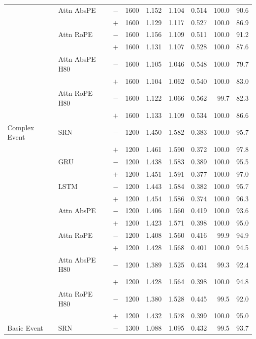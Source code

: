 \begin{table}[t]
\begin{tabular}{@{}lllrrrrrr@{}}
 & Attn AbsPE & $-$ & 1600 & 1.152 & 1.104 & 0.514 & 100.0 & 90.6 \\
 &  & $+$ & 1600 & 1.129 & 1.117 & 0.527 & 100.0 & 86.9 \\
\addlinespace[1pt]
 & Attn RoPE & $-$ & 1600 & 1.156 & 1.109 & 0.511 & 100.0 & 91.2 \\
 &  & $+$ & 1600 & 1.131 & 1.107 & 0.528 & 100.0 & 87.6 \\
\addlinespace[1pt]
 & Attn AbsPE H80 & $-$ & 1600 & 1.105 & 1.046 & 0.548 & 100.0 & 79.7 \\
 &  & $+$ & 1600 & 1.104 & 1.062 & 0.540 & 100.0 & 83.0 \\
\addlinespace[1pt]
 & Attn RoPE H80 & $-$ & 1600 & 1.122 & 1.066 & 0.562 & 99.7 & 82.3 \\
 &  & $+$ & 1600 & 1.133 & 1.109 & 0.534 & 100.0 & 86.6 \\
\addlinespace
Complex Event & SRN & $-$ & 1200 & 1.450 & 1.582 & 0.383 & 100.0 & 95.7 \\
 &  & $+$ & 1200 & 1.461 & 1.590 & 0.372 & 100.0 & 97.8 \\
\addlinespace[1pt]
 & GRU & $-$ & 1200 & 1.438 & 1.583 & 0.389 & 100.0 & 95.5 \\
 &  & $+$ & 1200 & 1.451 & 1.591 & 0.377 & 100.0 & 97.0 \\
\addlinespace[1pt]
 & LSTM & $-$ & 1200 & 1.443 & 1.584 & 0.382 & 100.0 & 95.7 \\
 &  & $+$ & 1200 & 1.454 & 1.586 & 0.374 & 100.0 & 96.3 \\
\addlinespace[1pt]
 & Attn AbsPE & $-$ & 1200 & 1.406 & 1.560 & 0.419 & 100.0 & 93.6 \\
 &  & $+$ & 1200 & 1.423 & 1.571 & 0.398 & 100.0 & 95.0 \\
\addlinespace[1pt]
 & Attn RoPE & $-$ & 1200 & 1.408 & 1.560 & 0.416 & 99.9 & 94.9 \\
 &  & $+$ & 1200 & 1.428 & 1.568 & 0.401 & 100.0 & 94.5 \\
\addlinespace[1pt]
 & Attn AbsPE H80 & $-$ & 1200 & 1.389 & 1.525 & 0.434 & 99.3 & 92.4 \\
 &  & $+$ & 1200 & 1.428 & 1.564 & 0.398 & 100.0 & 94.8 \\
\addlinespace[1pt]
 & Attn RoPE H80 & $-$ & 1200 & 1.380 & 1.528 & 0.445 & 99.5 & 92.0 \\
 &  & $+$ & 1200 & 1.432 & 1.578 & 0.399 & 100.0 & 95.0 \\
\addlinespace
Basic Event & SRN & $-$ & 1300 & 1.088 & 1.095 & 0.432 & 99.5 & 93.7 \\

\end{tabular}
\end{table}
